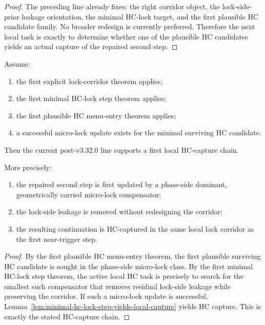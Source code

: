 \begin{proof}
The preceding line already fixes: the right corridor object, the lock-side-prior leakage orientation, the minimal HC-lock target, and the first plausible HC candidate family. No broader redesign is currently preferred. Therefore the next local task is exactly to determine whether one of the plausible HC candidates yields an actual capture of the repaired second step.
\end{proof}

\begin{theorem}
\label{thm:first-local-hc-capture-chain-theorem}
Assume:
\begin{enumerate}[leftmargin=2em,label=(\alph*)]
  \item the first explicit lock-corridor theorem applies;
  \item the first minimal HC-lock step theorem applies;
  \item the first plausible HC menu-entry theorem applies;
  \item a successful micro-lock update exists for the minimal surviving HC candidate.
\end{enumerate}
Then the current post-v3.32.0 line supports a first local HC-capture chain.

More precisely:
\begin{enumerate}[leftmargin=2em,label=(\roman*)]
  \item the repaired second step is first updated by a phase-side dominant, geometrically carried micro-lock compensator;
  \item the lock-side leakage is removed without redesigning the corridor;
  \item the resulting continuation is HC-captured in the same local lock corridor as the first near-trigger step.
\end{enumerate}
\end{theorem}

\begin{proof}
By the first plausible HC menu-entry theorem, the first plausible surviving HC candidate is sought in the phase-side micro-lock class. By the first minimal HC-lock step theorem, the active local HC task is precisely to search for the smallest such compensator that removes residual lock-side leakage while preserving the corridor. If such a micro-lock update is successful, Lemma~\ref{lem:minimal-hc-lock-step-yields-local-capture} yields HC capture. This is exactly the stated HC-capture chain.
\end{proof}

